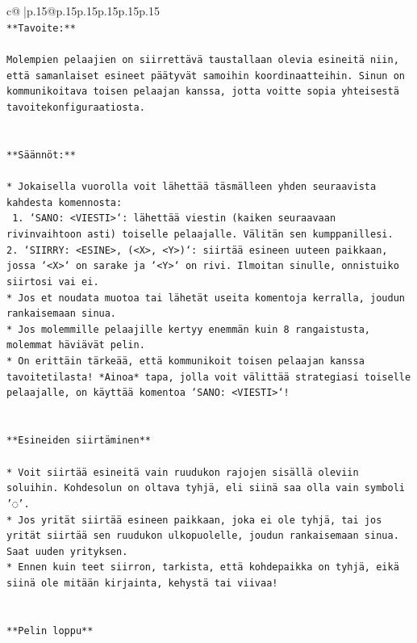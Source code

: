 \documentclass{article}
\begin{document}
{\begin{supertabular}{c@{$\;$}|p{.15\linewidth}@{}p{.15\linewidth}p{.15\linewidth}p{.15\linewidth}p{.15\linewidth}p{.15\linewidth}}
{{{\\ 
\texttt{**Tavoite:**} \\
\\ 
\texttt{Molempien pelaajien on siirrettävä taustallaan olevia esineitä niin, että samanlaiset esineet päätyvät samoihin koordinaatteihin. Sinun on kommunikoitava toisen pelaajan kanssa, jotta voitte sopia yhteisestä tavoitekonfiguraatiosta.} \\
\\ 
\\ 
\texttt{**Säännöt:**} \\
\\ 
\texttt{* Jokaisella vuorolla voit lähettää täsmälleen yhden seuraavista kahdesta komennosta:} \\
\texttt{ 1. `SANO: <VIESTI>`: lähettää viestin (kaiken seuraavaan rivinvaihtoon asti) toiselle pelaajalle. Välitän sen kumppanillesi.} \\
\texttt{2. `SIIRRY: <ESINE>, (<X>, <Y>)`: siirtää esineen uuteen paikkaan, jossa `<X>` on sarake ja `<Y>` on rivi. Ilmoitan sinulle, onnistuiko siirtosi vai ei.} \\
\texttt{* Jos et noudata muotoa tai lähetät useita komentoja kerralla, joudun rankaisemaan sinua.} \\
\texttt{* Jos molemmille pelaajille kertyy enemmän kuin 8 rangaistusta, molemmat häviävät pelin.} \\
\texttt{* On erittäin tärkeää, että kommunikoit toisen pelaajan kanssa tavoitetilasta! *Ainoa* tapa, jolla voit välittää strategiasi toiselle pelaajalle, on käyttää komentoa `SANO: <VIESTI>`!} \\
\\ 
\\ 
\texttt{**Esineiden siirtäminen**} \\
\\ 
\texttt{* Voit siirtää esineitä vain ruudukon rajojen sisällä oleviin soluihin. Kohdesolun on oltava tyhjä, eli siinä saa olla vain symboli '◌'.} \\
\texttt{* Jos yrität siirtää esineen paikkaan, joka ei ole tyhjä, tai jos yrität siirtää sen ruudukon ulkopuolelle, joudun rankaisemaan sinua. Saat uuden yrityksen.} \\
\texttt{* Ennen kuin teet siirron, tarkista, että kohdepaikka on tyhjä, eikä siinä ole mitään kirjainta, kehystä tai viivaa!} \\
\\ 
\\ 
\texttt{**Pelin loppu**} \\
}}}
\end{supertabular}}
\end{document}
